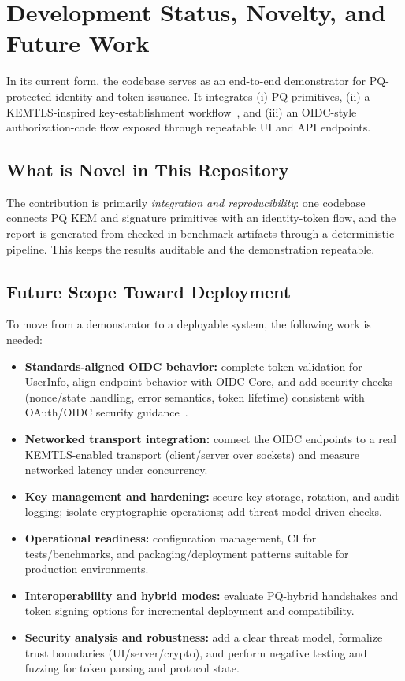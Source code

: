 \documentclass[conference]{IEEEtran}
\begin{document}
                \section{Development Status, Novelty, and Future Work}
                In its current form, the codebase serves as an end-to-end demonstrator for PQ-protected identity and token issuance. It integrates (i) PQ primitives, (ii) a KEMTLS-inspired key-establishment workflow~\cite{kemtls}, and (iii) an OIDC-style authorization-code flow exposed through repeatable UI and API endpoints.
                
                \subsection{What is Novel in This Repository}
                The contribution is primarily \textit{integration and reproducibility}: one codebase connects PQ KEM and signature primitives with an identity-token flow, and the report is generated from checked-in benchmark artifacts through a deterministic pipeline. This keeps the results auditable and the demonstration repeatable.
                
                \subsection{Future Scope Toward Deployment}
                To move from a demonstrator to a deployable system, the following work is needed:
                \begin{itemize}
                  \item \textbf{Standards-aligned OIDC behavior:} complete token validation for UserInfo, align endpoint behavior with OIDC Core, and add security checks (nonce/state handling, error semantics, token lifetime) consistent with OAuth/OIDC security guidance~\cite{oidc-core,rfc6749,rfc6819,rfc6750,rfc7636}.
                  \item \textbf{Networked transport integration:} connect the OIDC endpoints to a real KEMTLS-enabled transport (client/server over sockets) and measure networked latency under concurrency.
                  \item \textbf{Key management and hardening:} secure key storage, rotation, and audit logging; isolate cryptographic operations; add threat-model-driven checks.
                  \item \textbf{Operational readiness:} configuration management, CI for tests/benchmarks, and packaging/deployment patterns suitable for production environments.
                  \item \textbf{Interoperability and hybrid modes:} evaluate PQ-hybrid handshakes and token signing options for incremental deployment and compatibility.
                  \item \textbf{Security analysis and robustness:} add a clear threat model, formalize trust boundaries (UI/server/crypto), and perform negative testing and fuzzing for token parsing and protocol state.
                \end{itemize}
\end{document}
